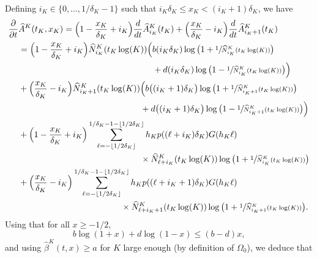 \documentclass[JEP,XML,SOM,Unicode,published]{cedram}
\let\f\frac
\theoremstyle{plain}
\theoremstyle{remark}
\begin{document}
Defining $i_K\in\{0,\ldots,1/\delta_K-1\}$ such that $i_K\delta_K\leq {x_K}<(i_K+1)\delta_K$, we have\vspace*{-3pt}
\begin{align*}
\frac{\partial}{\partial t} &\widehat A^K(t_K,x_K) =
\Bigl(1-\f {x_K}{\delta_K}+i_K\Bigr)\frac{d}{dt} \widehat A_{i_K}^K(t_K)+\Bigl(\f {x_K}{\delta_K}-i_K\Bigr) \frac{d}{dt} \widehat A_{i_K+1}^K(t_K)\\
&=\Bigl(1-\f {x_K}{\delta_K}+i_K\Bigr) \widehat N_{i_K}^K(t_K \log(K))\Big(b(i_K\delta_K) \log \big(1+\sfrac{1}{ \widehat N_{i_K}^K(t_K\log(K))} \big)\\
& \hspace{5.5cm} +d(i_K\delta_K) \log \big(1-\sfrac{1}{ \widehat N_{i_K}^K(t_K\log(K))} \big)\Big)\\
&+\Bigl(\f {x_K}{\delta_K}-i_K\Bigr) \widehat N_{i_K+1}^K(t_K\log(K))\Big(b\big((i_K+1)\delta_K\big) \log \big(1+\sfrac{1}{ \widehat N_{i_K+1}^K(t_K\log(K))} \big) \\
& \hspace{5cm} +d\big((i_K+1)\delta_K\big) \log \big(1-\sfrac{1}{ \widehat N_{i_K+1}^K(t_K\log(K))} \big)\Big)\\
&+ \Bigl(1-\f {x_K}{\delta_K}+i_K\Bigr) \sum_{\ell=-\lfloor 1/2\delta_K\rfloor}^{1/\delta_K-1-\lfloor 1/2\delta_K\rfloor}h_Kp((\ell+i_K)\delta_K)G(h_K\ell) \\
& \hspace{5cm} \times \widehat N_{\ell+i_K}^K(t_K\log(K))\log \big(1+\sfrac{1}{ \widehat N_{i_K}^K(t_K\log(K))} \big)\\
&+ \Bigl(\f {x_K}{\delta_K}-i_K\Bigr) \sum_{\ell=-\lfloor 1/2\delta_K\rfloor}^{1/\delta_K-1-\lfloor 1/2\delta_K\rfloor}h_Kp((\ell+i_K+1)\delta_K)G(h_K\ell)\\
& \hspace{4.2cm} \times \widehat N_{\ell+i_K+1}^K(t_K\log(K))\log \big(1+\sfrac{1}{ \widehat N_{i_K+1}^K(t_K\log(K))} \big).
\end{align*}
Using that for all $x\geq -1/2$,\vspace*{-3pt}\enlargethispage{\baselineskip}
\begin{equation*}
b\log(1+x)+d\log(1-x)\le (b-d) x,\label{approxlog2}
\end{equation*}
and using $\widehat{\beta}^K(t,x)\geq a$ for $K$ large enough (by definition of $\Omega_0$), we deduce that\vspace*{-3pt}
\end{document}
